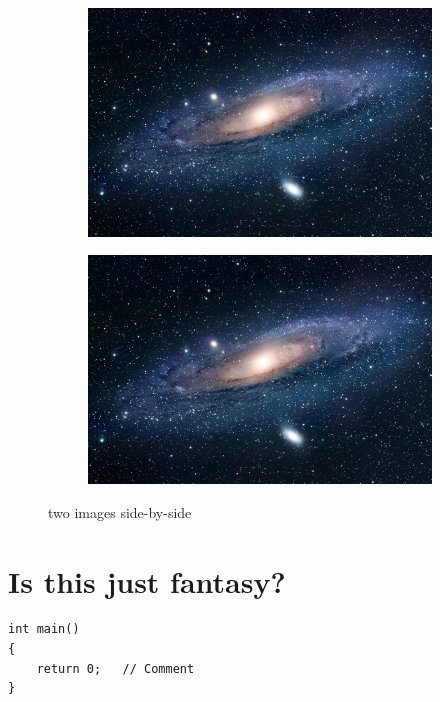 \begin{figure}[h]
        \begin{subfigure}{0.45\textwidth}
        \includegraphics[width=1\linewidth]{res/sample-image.jpeg} 
        
    \end{subfigure}
        \begin{subfigure}{0.45\textwidth}
        \includegraphics[width=1\linewidth]{res/sample-image.jpeg}
    \end{subfigure}
    
    \caption{two images side-by-side}
\end{figure}

\section{Is this just fantasy?}




\begin{lstlisting}[caption={Sample Algorithm}]
int main()
{
    return 0;   // Comment
}
\end{lstlisting}





